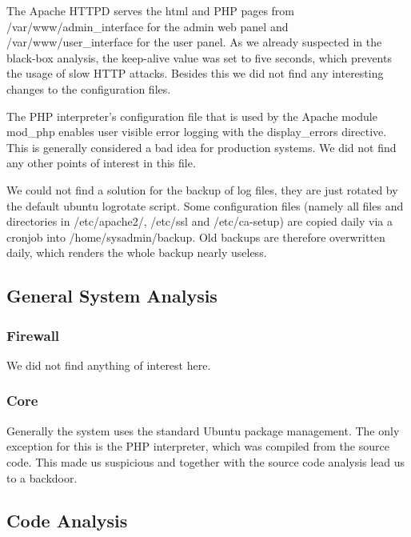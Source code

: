 \documentclass{article}
\begin{document}
The Apache HTTPD serves the html and PHP pages from /var/www/admin\_interface for the admin web panel and /var/www/user\_interface for the user panel. As we already suspected in the black-box analysis, the keep-alive value was set to five seconds, which prevents the usage of slow HTTP attacks. Besides this we did not find any interesting changes to the configuration files.

The PHP interpreter's configuration file that is used by the Apache module mod\_php enables user visible error logging with the display\_errors directive. This is generally considered a bad idea for production systems. We did not find any other points of interest in this file.

We could not find a solution for the backup of log files, they are just rotated by the default ubuntu logrotate script. Some configuration files (namely all files and directories in /etc/apache2/, /etc/ssl and /etc/ca-setup) are copied daily via a cronjob into /home/sysadmin/backup. Old backups are therefore overwritten daily, which renders the whole backup nearly useless.

\subsection{General System Analysis}
\subsubsection{Firewall}
We did not find anything of interest here.

\subsubsection{Core}
Generally the system uses the standard Ubuntu package management. The only exception for this is the PHP interpreter, which was compiled from the source code. This made us suspicious and together with the source code analysis lead us to a backdoor.

\subsection{Code Analysis}
\end{document}
